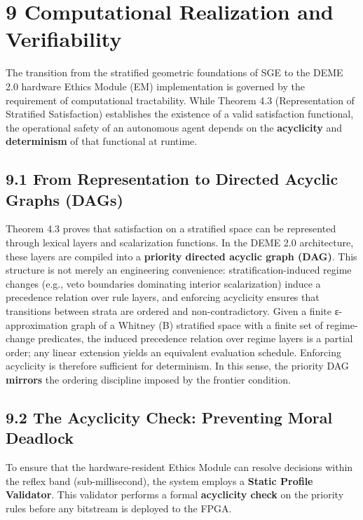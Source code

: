 \documentclass[12pt]{article}
\theoremstyle{plain}
\theoremstyle{definition}
\theoremstyle{remark}
\begin{document}
\section{9 Computational Realization and
Verifiability}\label{computational-realization-and-verifiability}

The transition from the stratified geometric foundations of SGE to the
DEME 2.0 hardware Ethics Module (EM) implementation is governed by the
requirement of computational tractability. While Theorem 4.3
(Representation of Stratified Satisfaction) establishes the existence of
a valid satisfaction functional, the operational safety of an autonomous
agent depends on the \textbf{acyclicity} and \textbf{determinism} of
that functional at runtime.

\subsection{9.1 From Representation to Directed Acyclic Graphs
(DAGs)}\label{from-representation-to-directed-acyclic-graphs-dags}

Theorem 4.3 proves that satisfaction on a stratified space can be
represented through lexical layers and scalarization functions. In the
DEME 2.0 architecture, these layers are compiled into a \textbf{priority
directed acyclic graph (DAG)}. This structure is not merely an
engineering convenience: stratification-induced regime changes (e.g.,
veto boundaries dominating interior scalarization) induce a precedence
relation over rule layers, and enforcing acyclicity ensures that
transitions between strata are ordered and non-contradictory. Given a
finite ε-approximation graph of a Whitney (B) stratified space with a
finite set of regime-change predicates, the induced precedence relation
over regime layers is a partial order; any linear extension yields an
equivalent evaluation schedule. Enforcing acyclicity is therefore
sufficient for determinism. In this sense, the priority DAG
\textbf{mirrors} the ordering discipline imposed by the frontier
condition.

\subsection{9.2 The Acyclicity Check: Preventing Moral
Deadlock}\label{the-acyclicity-check-preventing-moral-deadlock}

To ensure that the hardware-resident Ethics Module can resolve decisions
within the reflex band (sub-millisecond), the system employs a
\textbf{Static Profile Validator}. This validator performs a formal
\textbf{acyclicity check} on the priority rules before any bitstream is
deployed to the FPGA.
\end{document}
